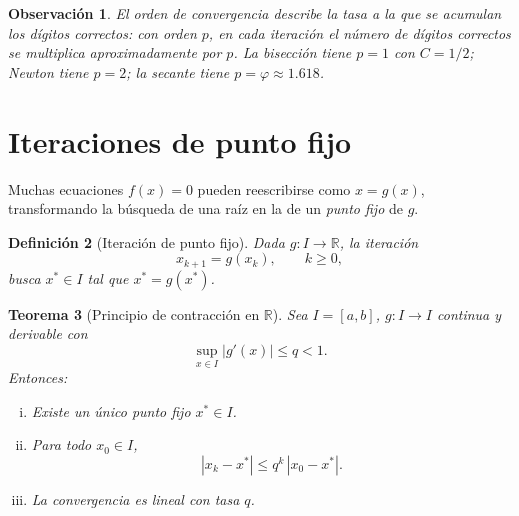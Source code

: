 \documentclass[a4paper,11pt]{report}
\newtheorem{theorem}{Teorema}[chapter]
\newtheorem{definition}[theorem]{Definición}
\newtheorem{remark}[theorem]{Observación}
\begin{document}
\begin{remark}
El orden de convergencia describe la tasa a la que se acumulan los dígitos
correctos: con orden $p$, en cada iteración el número de dígitos correctos
se multiplica aproximadamente por $p$.  La bisección tiene $p=1$ con $C=1/2$;
Newton tiene $p=2$; la secante tiene $p=\varphi\approx1.618$.
\end{remark}

\section{Iteraciones de punto fijo}
\label{sec:punto_fijo}

Muchas ecuaciones $f(x)=0$ pueden reescribirse como $x=g(x)$,
transformando la búsqueda de una raíz en la de un \emph{punto fijo} de $g$.

\begin{definition}[Iteración de punto fijo]\label{def:punto_fijo}
Dada $g:I\to\mathbb{R}$, la iteración
\[
x_{k+1}=g(x_k),\qquad k\ge 0,
\]
busca $x^*\in I$ tal que $x^*=g(x^*)$.
\end{definition}

\begin{theorem}[Principio de contracción en $\mathbb{R}$]\label{thm:contraccion}
Sea $I=[a,b]$, $g:I\to I$ continua y derivable con
\[
\sup_{x\in I}|g'(x)|\le q<1.
\]
Entonces:
\begin{enumerate}[(i)]
\item Existe un único punto fijo $x^*\in I$.
\item Para todo $x_0\in I$,
\[
|x_k-x^*|\le q^k\,|x_0-x^*|.
\]
\item La convergencia es lineal con tasa $q$.
\end{enumerate}
\end{theorem}
\end{document}
